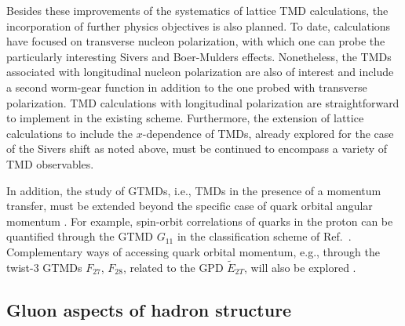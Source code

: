 Besides these improvements of the systematics of lattice TMD
calculations,  the incorporation of further physics objectives is
also planned. To date, calculations have focused on transverse nucleon
polarization, with which one can probe the particularly interesting
Sivers and Boer-Mulders effects. Nonetheless,  the TMDs associated
with longitudinal nucleon polarization are also of interest and include a
second worm-gear function in addition to the one probed with transverse
polarization. TMD calculations with longitudinal polarization are
straightforward to implement in the existing scheme. Furthermore, the
extension of lattice calculations to include the $x$-dependence of TMDs,
already explored for the case of the Sivers shift as noted above, must be
continued to encompass a variety of TMD observables.

In addition, the study of GTMDs, i.e., TMDs in the presence of a
momentum transfer, must be extended beyond the specific case of quark
orbital angular momentum \cite{Engelhardt:2017miy}. For example, spin-orbit correlations of quarks
in the proton can be quantified through the GTMD $G_{11} $ in the
classification scheme of Ref.~\cite{Meissner:2009ww}.
Complementary ways of accessing quark orbital
momentum, e.g., through the twist-3 GTMDs $F_{27} $, $F_{28} $, related
to the GPD $\widetilde{E}_{2T} $, will also be explored  \cite{Meissner:2009ww}.











\subsection{Gluon aspects of hadron structure}

